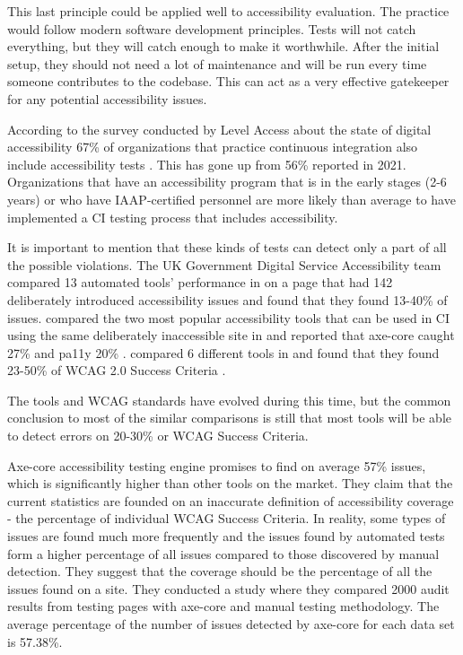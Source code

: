 \documentclass{master_thesis}
\begin{document}
This last principle could be applied well to accessibility evaluation. The practice would follow modern software development principles. Tests will not catch everything, but they will catch enough to make it worthwhile. After the initial setup, they should not need a lot of maintenance and will be run every time someone contributes to the codebase. This can act as a very effective gatekeeper for any potential accessibility issues.

According to the survey conducted by Level Access about the state of digital accessibility 67\% of organizations that practice continuous integration also include accessibility tests \citep{LevelAccess}. This has gone up from 56\% reported in 2021. Organizations that have an accessibility program that is in the early stages (2-6 years) or who have IAAP-certified personnel are more likely than average to have implemented a CI testing process that includes accessibility.

It is important to mention that these kinds of tests can detect only a part of all the possible violations. The UK Government Digital Service Accessibility team compared 13 automated tools' performance in \citeyear{GAT2018} on a page that had 142 deliberately introduced accessibility issues and found that they found 13-40\% of issues. \citeauthor{Abbott2021} compared the two most popular accessibility tools that can be used in CI using the same deliberately inaccessible site in \citeyear{Abbott2021} and reported that axe-core caught 27\% and pa11y 20\% \citep{Abbott2021}. \citeauthor{Vigo2013} compared 6 different tools in \citeyear{Vigo2013} and found that they found 23-50\% of  WCAG 2.0 Success Criteria \citep{GAT2018, Abbott2021, Vigo2013}.

The tools and WCAG standards have evolved during this time, but the common conclusion to most of the similar comparisons is still that most tools will be able to detect errors on 20-30\% or WCAG Success Criteria. 

Axe-core accessibility testing engine promises to find on average 57\% issues, which is significantly higher than other tools on the market\citep{Deque2023}. They claim that the current statistics are founded on an inaccurate definition of accessibility coverage - the percentage of individual WCAG Success Criteria. In reality, some types of issues are found much more frequently and the issues found by automated tests form a higher percentage of all issues compared to those discovered by manual detection. They suggest that the coverage should be the percentage of all the issues found on a site. They conducted a study where they compared 2000 audit results from testing pages with axe-core and manual testing methodology. The average percentage of the number of issues detected by axe-core for each data set is 57.38\%.
\end{document}
